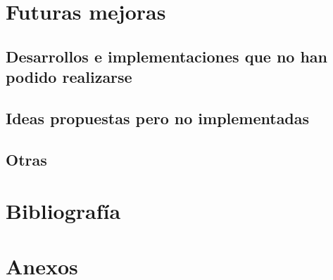 \chapter{Futuras mejoras}

\section{Desarrollos e implementaciones que no han podido realizarse}

\section{Ideas propuestas pero no implementadas}

\section{Otras}


\chapter*{Bibliografía}


\chapter*{Anexos}

